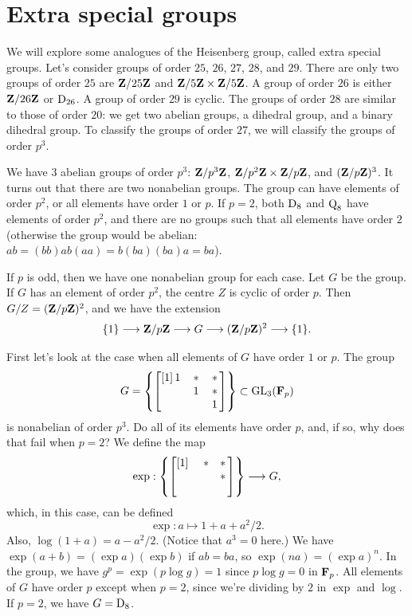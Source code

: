 \documentclass[11pt, oneside]{amsart}
\begin{document}
\section{Extra special groups}
We will explore some analogues of the Heisenberg group, called extra special groups. Let's consider groups of order $25$, $26$, $27$, $28$, and $29$. There are only two groups of order $25$ are $\mathbf Z / 25\mathbf Z$ and $\mathbf Z / 5\mathbf Z\times \mathbf Z / 5\mathbf Z$. A group of order $26$ is either $\mathbf Z / 26\mathbf Z$ or $\operatorname{D}_{26}$. A group of order $29$ is cyclic.  The groups of order $28$ are similar to those of order $20$: we get two abelian groups, a dihedral group, and a binary dihedral group.  To classify the groups of order $27$, we will classify the groups of order $p^3$.

We have $3$ abelian groups of order $p^3$: $\mathbf Z / p^3\mathbf Z$, $\mathbf Z / p^2\mathbf Z\times \mathbf Z / p\mathbf Z$, and $(\mathbf Z / p\mathbf Z)^3$. It turns out that there are two nonabelian groups. The group can have elements of order $p^2$, or all elements have order $1$ or $p$. If $p=2$, both $\operatorname{D}_8$ and $\operatorname{Q}_8$ have elements of order $p^2$, and there are no groups such that all elements have order $2$ (otherwise the group would be abelian: $ab = (bb)ab(aa) = b (ba)(ba)a = ba$).

If $p$ is odd, then we have one nonabelian group for each case. Let $G$ be the group. If $G$ has an element of order $p^2$, the centre $Z$ is cyclic of order $p$. Then $G/Z = (\mathbf Z / p\mathbf Z)^2$, and we have the extension
$$
\{1\} \longrightarrow \mathbf Z / p\mathbf Z \longrightarrow G \longrightarrow (\mathbf Z / p\mathbf Z)^2 \longrightarrow \{1\}.
$$

First let's look at the case when all elements of $G$ have order $1$ or $p$. The group
$$
G=\left \{ \begin{bmatrix} [1]   \,1 & \,* & \,*\, \\ \, & \,1 &\, *\,\\ \, & \, & \,1\, \end{bmatrix} \right\} \subset \operatorname{GL}_3(\mathbf F_p)
$$ 
is nonabelian of order $p^3$. Do all of its elements have order $p$, and, if so, why does that fail when $p=2$? We define the map
$$
\exp : \left \{ \begin{bmatrix} [1]   \,\,& * & *\, \\ \, &  & *\,\\ \, &  & \, \end{bmatrix} \right\} \longrightarrow G,
$$
which, in this case, can be defined
$$
\exp : a \mapsto 1 + a + a^2/2.
$$
Also, $\log(1+a) = a - a^2/2$. (Notice that $a^3 = 0$ here.) We have $\exp (a+b)  = (\exp a)(\exp b)$ if $ab=ba$, so $\exp (na)= (\exp a)^n$. In the group, we have $g^p = \exp (p\log g) = 1$ since $p\log g=0$ in $\mathbf F_p$. All elements of $G$ have order $p$ except when $p=2$, since we're dividing by $2$ in $\exp$ and $\log$. If $p=2$, we have $G = \operatorname{D}_8$. 
\end{document}

